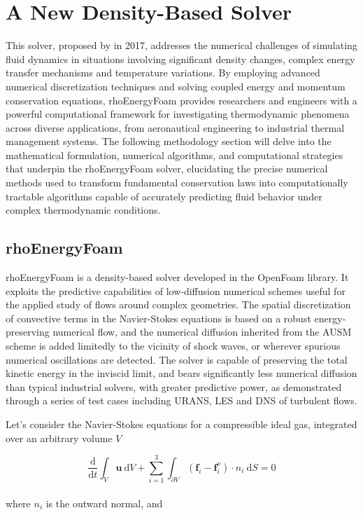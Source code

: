 \documentclass[a5paper]{sapthesis}
\begin{document}
	\chapter{A New Density-Based Solver}
	\label{chap:methodology}
    This solver, proposed by \citet{rhoEnergyFoam} in 2017, addresses the numerical challenges of simulating fluid dynamics in situations involving significant density changes, complex energy transfer mechanisms and temperature variations. By employing advanced numerical discretization techniques and solving coupled energy and momentum conservation equations, rhoEnergyFoam provides researchers and engineers with a powerful computational framework for investigating thermodynamic phenomena across diverse applications, from aeronautical engineering to industrial thermal management systems. The following methodology section will delve into the mathematical formulation, numerical algorithms, and computational strategies that underpin the rhoEnergyFoam solver, elucidating the precise numerical methods used to transform fundamental conservation laws into computationally tractable algorithms capable of accurately predicting fluid behavior under complex thermodynamic conditions.
	
	\section{rhoEnergyFoam}
	rhoEnergyFoam is a density-based solver developed in the OpenFoam library. It exploits the predictive capabilities of low-diffusion numerical schemes useful for the applied study of flows around complex geometries. The spatial discretization of convective terms in the Navier-Stokes equations is based on a robust energy-preserving numerical flow, and the numerical diffusion inherited from the AUSM scheme is added limitedly to the vicinity of shock waves, or wherever spurious numerical oscillations are detected. The solver is capable of preserving the total kinetic energy in the inviscid limit, and bears significantly less numerical diffusion than typical industrial solvers, with greater predictive power, as demonstrated through a series of test cases including URANS, LES and DNS of turbulent flows.  
	
	\noindent Let's consider the Navier-Stokes equations for a compressible ideal gas, integrated over an arbitrary volume $V$
	
	\begin{equation}
		\dfrac{\mathrm{d}}{\mathrm{d}t}\int_V \textbf{u} \ \mathrm{d}V + \sum_{i=1}^{3} \int_{\partial{V}} (\textbf{f}_i-\textbf{f}_i^{\nu}) \cdot n_i \ \mathrm{d}S = 0
		\label{NS-compressible}
	\end{equation}
	\\
	where  $n_i$ is the outward normal, and
	
\end{document}
